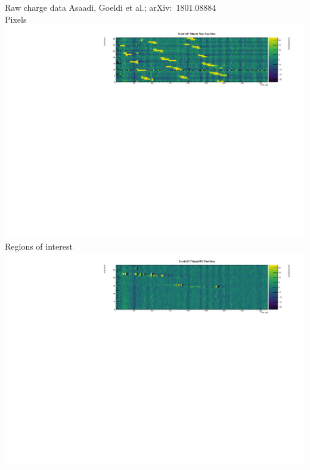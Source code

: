 \documentclass[]{beamer}
\begin{document}
\begin{frame}{Raw charge data}{}
	{\tiny Asaadi, Goeldi et al.; arXiv:~1801.08884~\cite{pixel_paper}}\\
	\centering
	Pixels\\
	\includegraphics[viewport=20 0 550 140, clip, width=\textwidth]{defence/event967_rawFilteredPixel}\\
	Regions of interest\\
	\includegraphics[viewport=20 0 550 140, clip, width=\textwidth]{defence/event967_rawFilteredROI}
\end{frame}
\end{document}
